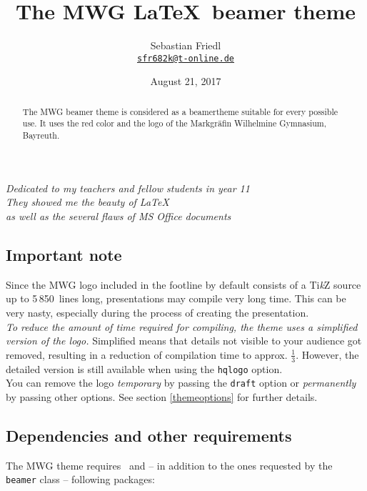 \documentclass[11pt]{ltxdoc}
\title{The MWG \LaTeX\ beamer theme}
\author{Sebastian Friedl \\ \href{mailto:sfr682k@t-online.de}{\texttt{sfr682k@t-online.de}}}
\date{August 21, 2017}
\begin{document}
	\maketitle
	\thispagestyle{empty}
	

	\begin{center} \itshape
		Dedicated to my teachers and fellow students in year 11 \\[1.25\smallskipamount]
		They showed me the beauty of \LaTeX \\
		as well as the several flaws of MS Office documents
	\end{center}
	
	\medskip
	\begin{abstract}
		\hspace{-1.5em}%
		The MWG beamer theme is considered as a beamertheme suitable for every possible use. It uses the red color and the logo of the Markgräfin Wilhelmine Gymnasium, Bayreuth.
	\end{abstract}
	

	\tableofcontents

	\clearpage
	
	\subsection*{Important note}
	Since the MWG logo included in the footline by default consists of a Ti\textit{k}Z source up to 5\,850~lines long, presentations may compile very long time. This can be very nasty, especially during the process of creating the presentation. \\
	\emph{To reduce the amount of time required for compiling, the theme uses a simplified version of the logo.} Simplified means that details not visible to your audience got removed, resulting in a reduction of compilation time to approx. $\tfrac13$. However, the detailed version is still available when using the \texttt{hqlogo} option. \\
	You can remove the logo \emph{temporary} by passing the \texttt{draft} option or \emph{permanently} by passing other options. See section \ref{themeoptions} for further details.
	
	
	\subsection*{Dependencies and other requirements}
	The MWG theme requires \LaTeXe\ and -- in addition to the ones requested by the \texttt{beamer} class -- following packages:
	
\end{document}
